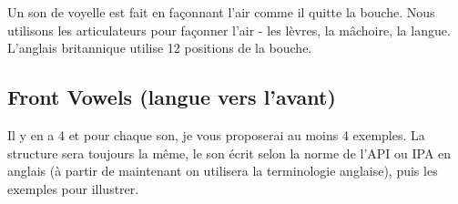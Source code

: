\chapter{}
\label{chap:vow}
Un son de voyelle est fait en façonnant l'air comme il quitte la
bouche. Nous utilisons les articulateurs pour façonner l'air - les
lèvres, la mâchoire, la langue. L'anglais britannique utilise 12 positions de la bouche.
\section{\textenglish{Front Vowels} (langue vers l'avant)}
\label{sec:orge433061}
Il y en a 4 et pour chaque son, je vous proposerai au moins 4
exemples. La structure sera toujours la même, le son écrit selon la
norme de l'API ou IPA en anglais (à partir de maintenant on utilisera
la terminologie anglaise), puis les exemples pour illustrer.
